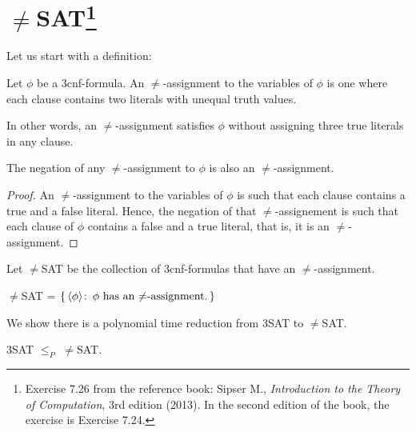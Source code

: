 \section{\texorpdfstring{$\ne$SAT\footnote{%
Exercise 7.26 from the reference book: Sipser M.,
\emph{Introduction to the Theory of Computation}, 3rd edition
(2013).
In the second edition of the book, the exercise is Exercise 7.24.
}}{$\ne$SAT}}

Let us start with a definition:
\begin{definition}
  Let $\phi$ be a 3cnf-formula. An $\ne$-assignment to the variables of $\phi$
  is one where each clause contains two literals with unequal truth values.
\end{definition}
In other words, an $\ne$-assignment satisfies $\phi$ without assigning three
true literals in any clause.

\begin{theorem}\label{neg}
  The negation of any $\ne$-assignment to $\phi$ is also an $\ne$-assignment.
\end{theorem}
\begin{proof}
  An $\ne$-assignment to the variables of $\phi$ is such that each clause
  contains a true and a false literal. Hence, the negation of that
  $\ne$-assignement is such that each clause of $\phi$ contains a false
  and a true literal, that is, it is an $\ne$-assignment.
\end{proof}

Let $\ne$SAT be the collection of 3cnf-formulas that have an $\ne$-assignment.
\begin{definition}
  $\ne$SAT = $\{\,\langle \phi \rangle\colon\, \text{$\phi$ has an $\ne$-assignment.} \,\}$
\end{definition}

We show there is a polynomial time reduction from 3SAT to $\ne$SAT.
\begin{theorem}
  3SAT $\le_P$ $\ne$SAT.
\end{theorem}

